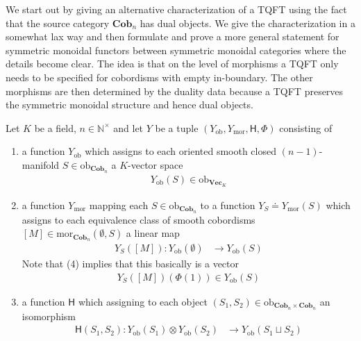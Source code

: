 \nocite{0a816f4c}
\nocite{5175de60}
We start out by giving an alternative characterization of a TQFT using the fact that the source category $\mathbf{Cob}_{n}$ has dual objects. We give the characterization in a somewhat lax way and then formulate and prove a more general statement for symmetric monoidal functors between symmetric monoidal categories where the details become clear. The idea is that on the level of morphisms a TQFT only needs to be specified for cobordisms with empty in-boundary. The other morphisms are then determined by the duality data because a TQFT preserves the symmetric monoidal structure and hence dual objects.
\\
\begin{cor}
\label{cor:actqft}
Let $K$ be a field, $n \in \mathbb{N}^{\times}$ and let $Y$ be a tuple $(Y_{\mathrm{ob}},Y_{\mathrm{mor}},\mathsf{H},\Phi)$ consisting of
\begin{enumerate}
\item
a function $Y_{\mathrm{ob}}$ which assigns to each oriented smooth closed $(n-1)$-manifold $S \in \mathrm{ob}_{\mathbf{Cob}_{n}}$ a $K$-vector space
\begin{align*}
  Y_{\mathrm{ob}}(S)
  \in
  \mathrm{ob}_{\mathbf{Vec}_{K}}
\end{align*}

\item
a function $Y_{\mathrm{mor}}$ mapping each $S \in \mathrm{ob}_{\mathbf{Cob}_{n}}$ to a function $Y_{S} \doteq Y_{\mathrm{mor}}(S)$ which assigns to each equivalence class of smooth cobordisms $[M] \in \mathrm{mor}_{\mathbf{Cob}_{n}}(\emptyset,S)$ a linear map
\begin{align*}
  Y_{S}([M])
  \colon
  Y_{\mathrm{ob}}(\emptyset)
  &\to
  Y_{\mathrm{ob}}(S)
\end{align*}
Note that (4) implies that this basically is a vector
\begin{align*}
  Y_{S}([M])(\Phi(1))
  \in
  Y_{\mathrm{ob}}(S)
\end{align*}

\item
a function $\mathsf{H}$ which assigning to each object $(S_{1},S_{2}) \in \mathrm{ob}_{\mathbf{Cob}_{n} \times \mathbf{Cob}_{n}}$ an isomorphism
\begin{align*}
  \mathsf{H}(S_{1},S_{2})
  \colon
  Y_{\mathrm{ob}}(S_{1}) \otimes Y_{\mathrm{ob}}(S_{2})
  &\to
  Y_{\mathrm{ob}}(S_{1} \sqcup S_{2})
\end{align*}


\end{enumerate}
\end{cor}
